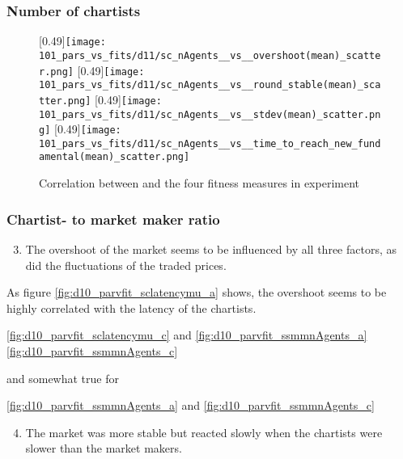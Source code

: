 \subsubsection{Number of chartists}
\begin{figure}
	\centering
	[0.49\linewidth]{\texttt{[image: 101\_pars\_vs\_fits/d11/sc\_nAgents\_\_vs\_\_overshoot(mean)\_scatter.png]}}
	[0.49\linewidth]{\texttt{[image: 101\_pars\_vs\_fits/d11/sc\_nAgents\_\_vs\_\_round\_stable(mean)\_scatter.png]}}
	[0.49\linewidth]{\texttt{[image: 101\_pars\_vs\_fits/d11/sc\_nAgents\_\_vs\_\_stdev(mean)\_scatter.png]}}
	[0.49\linewidth]{\texttt{[image: 101\_pars\_vs\_fits/d11/sc\_nAgents\_\_vs\_\_time\_to\_reach\_new\_fundamental(mean)\_scatter.png]}}
	\caption{Correlation between \scnAgents and the four fitness measures in experiment \dten}
	\label{fig:d10_parvfit_scnagents}
\end{figure}



\subsubsection{Chartist- to market maker ratio}




\begin{enumerate}
\setcounter{enumi}{2}
\item The overshoot of the market seems to be influenced by all three factors, as did the fluctuations of the traded prices.
\end{enumerate}
As figure \ref{fig:d10_parvfit_sclatencymu_a} shows, the overshoot seems to be highly correlated with the latency of the chartists.


\ref{fig:d10_parvfit_sclatencymu_c} and \ref{fig:d10_parvfit_ssmmnAgents_a} \ref{fig:d10_parvfit_ssmmnAgents_c}

and somewhat true for

\ref{fig:d10_parvfit_ssmmnAgents_a} and \ref{fig:d10_parvfit_ssmmnAgents_c}



\begin{enumerate}
\setcounter{enumi}{3}
\item The market was more stable but reacted slowly when the chartists were slower than the market makers.
\end{enumerate}






